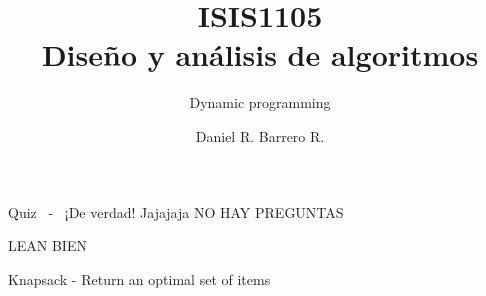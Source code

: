 \documentclass{beamer}
\title{ISIS1105\\ Diseño y análisis de algoritmos}
\subtitle{Dynamic programming}
\author{Daniel R. Barrero R.}
\begin{document}
\frame{\titlepage}

%

\begin{frame}{Quiz \ \pause - \ ¡De verdad! Jajajaja}
	\centering
	\large
	NO HAY PREGUNTAS

	\bigskip
	LEAN BIEN
\end{frame}

%

\begin{frame}{Knapsack - Return an optimal set of items}
	
	
\end{frame}
\end{document}
